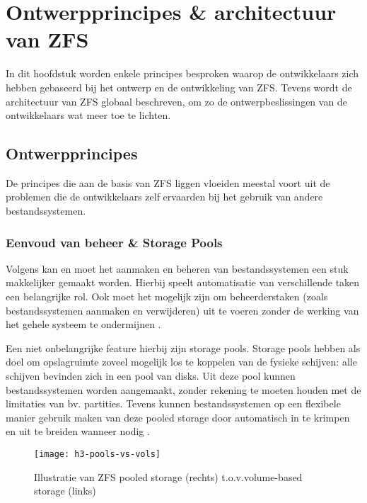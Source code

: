 
\chapter{Ontwerpprincipes \& architectuur van ZFS}
\label{ch:h3}

In dit hoofdstuk worden enkele principes besproken waarop de ontwikkelaars zich hebben gebaseerd bij het ontwerp en de ontwikkeling van ZFS. Tevens wordt de architectuur van ZFS globaal beschreven, om zo de ontwerpbeslissingen van de ontwikkelaars wat meer toe te lichten.

\section{Ontwerpprincipes}

De principes die aan de basis van ZFS liggen vloeiden meestal voort uit de problemen die de ontwikkelaars zelf ervaarden bij het gebruik van andere bestandssystemen.

\subsection{Eenvoud van beheer \& Storage Pools}

Volgens \textcite{ZFSBonwick} kan en moet het aanmaken en beheren van bestandssystemen een stuk makkelijker gemaakt worden. Hierbij speelt automatisatie van verschillende taken een belangrijke rol. Ook moet het mogelijk zijn om beheerderstaken (zoals bestandssystemen aanmaken en verwijderen) uit te voeren zonder de werking van het gehele systeem te ondermijnen \autocite{ZFSBonwick}. 

Een niet onbelangrijke feature hierbij zijn storage pools. Storage pools hebben als doel om opslagruimte zoveel mogelijk los te koppelen van de fysieke schijven: alle schijven bevinden zich in een pool van disks. Uit deze pool kunnen bestandssystemen worden aangemaakt, zonder rekening te moeten houden met de limitaties van bv. partities. Tevens kunnen bestandssystemen op een flexibele manier gebruik maken van deze pooled storage door automatisch in te krimpen en uit te breiden wanneer nodig \autocite{ZFSBonwick}. 

\begin{figure}
        \centering
        \texttt{[image: h3-pools-vs-vols]}
        \caption{Illustratie van ZFS pooled storage (rechts) t.o.v.volume-based storage (links) \autocite{ZFSBonwick}}
        \label{fig:bonwick_pools_illustratie}
\end{figure}
  
